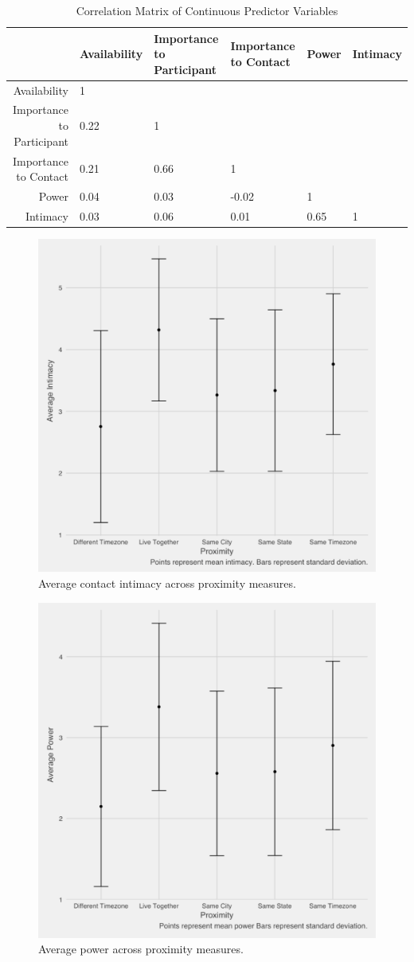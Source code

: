 \documentclass[12pt]{nuthesis}	%
\begin{document}
\begin{table}[ht] 
\fontsize{9}{9.5}\selectfont \centering 
\begin{tabular}{rlllll}
  \hline
 & Availability & Importance to Participant & Importance to Contact & Power & Intimacy \\ 
  \hline
Availability & 1 &  &  &  &  \\ 
  Importance to Participant & 0.22 & 1 &  &  &  \\ 
  Importance to Contact & 0.21 & 0.66 & 1 &  &  \\ 
  Power & 0.04 & 0.03 & -0.02 & 1 &  \\ 
  Intimacy & 0.03 & 0.06 & 0.01 & 0.65 & 1 \\ 
   \hline
\end{tabular}
  \caption{Correlation Matrix of Continuous Predictor Variables} 
  \label{tab:correlation} 
\end{table}

\begin{figure}[h]
\centering
\includegraphics[width=.7\textwidth]{figures/intimacy_by_distance}
\caption{Average contact intimacy across proximity measures.}
\label{fig:intimacy_by_distance}
\end{figure}

\begin{figure}[h]
\centering
\includegraphics[width=.7\textwidth]{figures/power_by_distance}
\caption{Average power across proximity measures.}
\label{fig:power_by_distance}
\end{figure}
\end{document}
